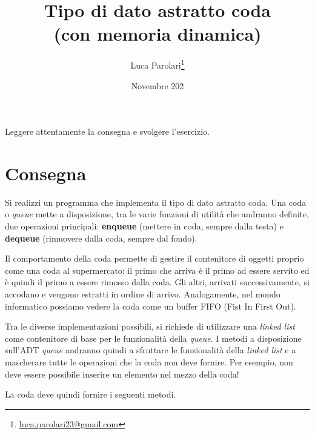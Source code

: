 \documentclass[addpoints,12pt,answers]{exam}
\author{Luca Parolari\footnote{\href{mailto:luca.parolari23@gmail.com}{luca.parolari23@gmail.com}}}
\begin{document}
    
    \title{Tipo di dato astratto coda\\ \large (con memoria dinamica)}
    \date{Novembre 202}
    
    \maketitle
    
    Leggere attentamente la consegna e svolgere l'esercizio.
        
    \section{Consegna}
    
    Si realizzi un programma che implementa il tipo di dato astratto
    coda. Una coda o \emph{queue} mette a disposizione, tra le varie
    funzioni di utilità che andranno definite, due operazioni 
    principali: \textbf{enqueue} (mettere in coda, sempre dalla testa)
    e \textbf{dequeue} (rimuovere dalla coda, sempre dal fondo).

    Il comportamento della coda permette di gestire il contenitore 
    di oggetti proprio come una coda al supermercato: il primo che 
    arriva è il primo ad essere servito ed è quindi il primo a essere
    rimosso dalla coda. Gli altri, arrivati successivamente,
    si accodano e vengono estratti in ordine di arrivo. Analogamente,
    nel mondo informatico possiamo vedere la coda come un buffer FIFO
    (Fist In First Out).

    Tra le diverse implementazioni possibili, si richiede di
    utilizzare una \emph{linked list} come contenitore di base per le
    funzionalità della \emph{queue}.  I metodi a disposizione sull'ADT
    \emph{queue} andranno quindi a sfruttare le funzionalità della
    \emph{linked list} e a mascherare tutte le operazioni che la coda
    non deve fornire. Per esempio, non deve essere possibile inserire
    un elemento nel mezzo della coda!

    La coda deve quindi fornire i seguenti metodi.
\end{document}
